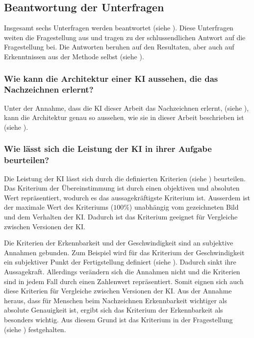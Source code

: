  
\subsection{Beantwortung der Unterfragen}\label{sub:d_frage_unter}
Insgesamt sechs Unterfragen werden beantwortet (siehe ).
Diese Unterfragen weiten die Fragestellung aus und tragen zu der
schlussendlichen Antwort auf die Fragestellung bei. Die Antworten beruhen auf
den Resultaten, aber auch auf Erkenntnissen aus der Methode selbst (siehe
).
 
\subsubsection*{Wie kann die Architektur einer KI aussehen, die das Nachzeichnen erlernt?}\label{subsub:d_frage_unter_1}
Unter der Annahme, dass die KI dieser Arbeit das Nachzeichnen erlernt, (siehe
), kann die Architektur genau so aussehen, wie sie in
dieser Arbeit beschrieben ist (siehe ).
 
\subsubsection*{Wie lässt sich die Leistung der KI in ihrer Aufgabe
beurteilen?}\label{subsub:d_frage_unter_2} Die Leistung der KI lässt sich durch
die definierten Kriterien (siehe ) beurteilen. Das
Kriterium der Übereinstimmung ist durch einen objektiven und absoluten Wert
repräsentiert, wodurch es das aussagekräftigste Kriterium ist. Ausserdem ist der
maximale Wert des Kriteriums ($100\%$) unabhängig vom gezeichneten Bild und dem
Verhalten der KI. Dadurch ist das Kriterium geeignet für Vergleiche zwischen
Versionen der KI.
 
Die Kriterien der Erkennbarkeit und der Geschwindigkeit sind an subjektive
Annahmen gebunden. Zum Beispiel wird für das Kriterium der Geschwindigkeit ein
subjektiver Punkt der Fertigstellung definiert (siehe
). Dadurch sinkt ihre Aussagekraft. Allerdings
verändern sich die Annahmen nicht und die Kriterien sind in jedem Fall durch
einen Zahlenwert repräsentiert. Somit eignen sich auch diese Kriterien für
Vergleiche zwischen Versionen der KI. Aus der Annahme heraus, dass für Menschen
beim Nachzeichnen Erkennbarkeit wichtiger als absolute Genauigkeit ist, ergibt
sich das Kriterium der Erkennbarkeit als besonders wichtig. Aus diesem Grund
ist das Kriterium in der Fragestellung (siehe )
festgehalten.
 
